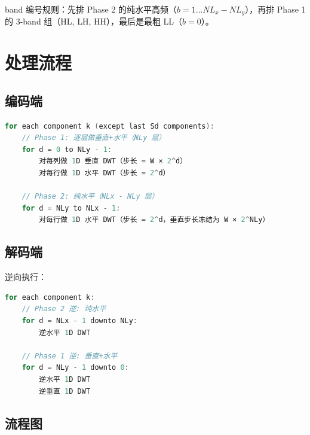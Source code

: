 band 编号规则：先排 Phase 2 的纯水平高频（$b = 1 \ldots NL_x - NL_y$），再排 Phase 1 的 3-band 组（HL, LH, HH），最后是最粗 LL（$b = 0$）。

\section{处理流程}

\subsection{编码端}

\begin{lstlisting}[language=C,numbers=none]
for each component k (except last Sd components):
    // Phase 1: 逐层做垂直+水平（NLy 层）
    for d = 0 to NLy - 1:
        对每列做 1D 垂直 DWT（步长 = W × 2^d）
        对每行做 1D 水平 DWT（步长 = 2^d）

    // Phase 2: 纯水平（NLx - NLy 层）
    for d = NLy to NLx - 1:
        对每行做 1D 水平 DWT（步长 = 2^d，垂直步长冻结为 W × 2^NLy）
\end{lstlisting}

\subsection{解码端}

逆向执行：

\begin{lstlisting}[language=C,numbers=none]
for each component k:
    // Phase 2 逆: 纯水平
    for d = NLx - 1 downto NLy:
        逆水平 1D DWT

    // Phase 1 逆: 垂直+水平
    for d = NLy - 1 downto 0:
        逆水平 1D DWT
        逆垂直 1D DWT
\end{lstlisting}

\subsection{流程图}

